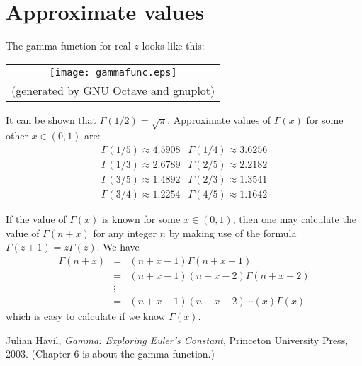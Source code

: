 \documentclass[12pt]{article}
\begin{document}
\section*{Approximate values}

The gamma function for real $z$ looks like this:
\begin{center}
\begin{tabular}{c}
\texttt{[image: gammafunc.eps]} \\
{\tiny (generated by GNU Octave and gnuplot) }
\end{tabular}
\end{center}

It can be shown that $\Gamma(1/2)=\sqrt{\pi}$.
Approximate values of $\Gamma(x)$ for some other $x\in(0,1)$ are:
\[
  \begin{array}{cc}
  \Gamma(1/5) \approx 4.5908 & \Gamma(1/4) \approx 3.6256 \\
  \Gamma(1/3) \approx 2.6789 & \Gamma(2/5) \approx 2.2182 \\
  \Gamma(3/5) \approx 1.4892 & \Gamma(2/3) \approx 1.3541 \\
  \Gamma(3/4) \approx 1.2254 & \Gamma(4/5) \approx 1.1642 
  \end{array}
\]

If the value of $\Gamma(x)$ is known for some $x\in(0,1)$,
then one may calculate the value of $\Gamma(n+x)$ for any integer $n$
by making use of the formula $\Gamma(z+1)=z\Gamma(z)$.
We have
\begin{eqnarray*}
  \Gamma(n+x) & = & (n+x-1)\Gamma(n+x-1) \\
  & = & (n+x-1)(n+x-2)\Gamma(n+x-2) \\
  & \vdots & \\
  & = & (n+x-1)(n+x-2)\cdots(x)\Gamma(x) 
\end{eqnarray*}
which is easy to calculate if we know $\Gamma(x)$.

\begin{thebibliography}{9}
 Julian Havil,
 {\it Gamma: Exploring Euler's Constant},
 Princeton University Press, 2003.
 (Chapter 6 is about the gamma function.)
\end{thebibliography}

\end{document}
